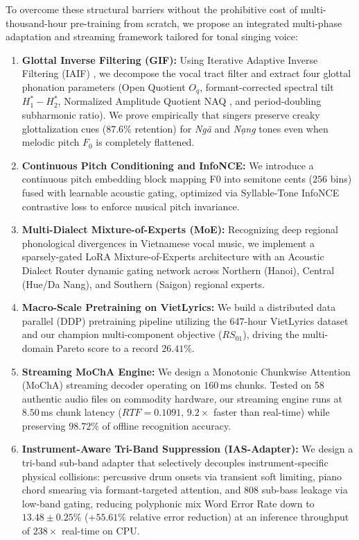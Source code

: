 To overcome these structural barriers without the prohibitive cost of multi-thousand-hour pre-training from scratch, we propose an integrated multi-phase adaptation and streaming framework tailored for tonal singing voice:
\begin{enumerate}
    \item \textbf{Glottal Inverse Filtering (GIF):} Using Iterative Adaptive Inverse Filtering (IAIF) \cite{alku1992glottal,iseli2004f0}, we decompose the vocal tract filter and extract four glottal phonation parameters (Open Quotient $O_q$, formant-corrected spectral tilt $H_1^*-H_2^*$, Normalized Amplitude Quotient NAQ \cite{alku2002normalized}, and period-doubling subharmonic ratio). We prove empirically that singers preserve creaky glottalization cues ($87.6\%$ retention) for \textit{Ng\~{a}} and \textit{N\d{a}ng} tones even when melodic pitch $F_0$ is completely flattened.
    \item \textbf{Continuous Pitch Conditioning and InfoNCE:} We introduce a continuous pitch embedding block mapping F0 into semitone cents ($256$ bins) fused with learnable acoustic gating, optimized via Syllable-Tone InfoNCE contrastive loss \cite{oord2018infonce,zhou2023rmvpe} to enforce musical pitch invariance.
    \item \textbf{Multi-Dialect Mixture-of-Experts (MoE):} Recognizing deep regional phonological divergences in Vietnamese vocal music, we implement a sparsely-gated LoRA Mixture-of-Experts architecture \cite{hu2021lora,shazeer2017outrageously,fedus2022switch} with an Acoustic Dialect Router dynamic gating network across Northern (Hanoi), Central (Hue/Da Nang), and Southern (Saigon) regional experts.
    \item \textbf{Macro-Scale Pretraining on VietLyrics:} We build a distributed data parallel (DDP) pretraining pipeline utilizing the 647-hour VietLyrics dataset \cite{vietlyrics2025} and our champion multi-component objective ($RS_{01}$), driving the multi-domain Pareto score to a record $26.41\%$.
    \item \textbf{Streaming MoChA Engine:} We design a Monotonic Chunkwise Attention (MoChA) \cite{chiu2018monotonic} streaming decoder operating on $160$\,ms chunks. Tested on 58 authentic audio files on commodity hardware, our streaming engine runs at $8.50$\,ms chunk latency ($RTF = 0.1091$, $9.2\times$ faster than real-time) while preserving $98.72\%$ of offline recognition accuracy.
    \item \textbf{Instrument-Aware Tri-Band Suppression (IAS-Adapter):} We design a tri-band sub-band adapter that selectively decouples instrument-specific physical collisions: percussive drum onsets via transient soft limiting, piano chord smearing via formant-targeted attention, and 808 sub-bass leakage via low-band gating, reducing polyphonic mix Word Error Rate down to $13.48 \pm 0.25\%$ ($+55.61\%$ relative error reduction) at an inference throughput of $238\times$ real-time on CPU.

\end{enumerate}
